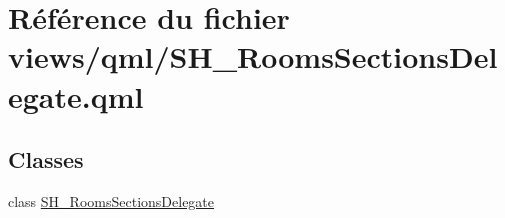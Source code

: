 \hypertarget{SH__RoomsSectionsDelegate_8qml}{\section{Référence du fichier views/qml/\-S\-H\-\_\-\-Rooms\-Sections\-Delegate.qml}
\label{SH__RoomsSectionsDelegate_8qml}
}
\subsection*{Classes}
\begin{DoxyCompactItemize}
\item 
class \hyperlink{classSH__RoomsSectionsDelegate}{S\-H\-\_\-\-Rooms\-Sections\-Delegate}
\end{DoxyCompactItemize}
